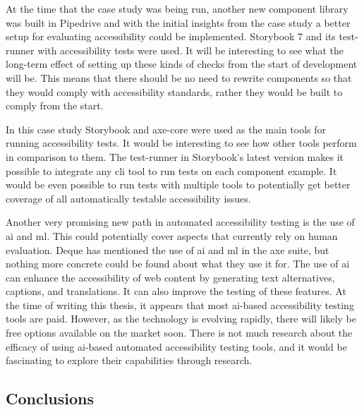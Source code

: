 \documentclass{master_thesis}
\begin{document}
At the time that the case study was being run, another new component library was built in Pipedrive and with the initial insights from the case study a better setup for evaluating accessibility could be implemented. Storybook 7 and its test-runner with accessibility tests were used. It will be interesting to see what the long-term effect of setting up these kinds of checks from the start of development will be. This means that there should be no need to rewrite components so that they would comply with accessibility standards, rather they would be built to comply from the start.

In this case study Storybook and axe-core were used as the main tools for running accessibility tests. It would be interesting to see how other tools perform in comparison to them. The test-runner in Storybook's latest version makes it possible to integrate any \ac{cli} tool to run tests on each component example. It would be even possible to run tests with multiple tools to potentially get better coverage of all automatically testable accessibility issues.

Another very promising new path in automated accessibility testing is the use of \ac{ai} and \ac{ml}. This could potentially cover aspects that currently rely on human evaluation. Deque has mentioned the use of \ac{ai} and \ac{ml} in the axe suite, but nothing more concrete could be found about what they use it for. The use of \ac{ai} can enhance the accessibility of web content by generating text alternatives, captions, and translations. It can also improve the testing of these features. At the time of writing this thesis, it appears that most \ac{ai}-based accessibility testing tools are paid. However, as the technology is evolving rapidly, there will likely be free options available on the market soon. There is not much research about the efficacy of using \ac{ai}-based automated accessibility testing tools, and it would be fascinating to explore their capabilities through research.

\subsection{Conclusions}
\end{document}
